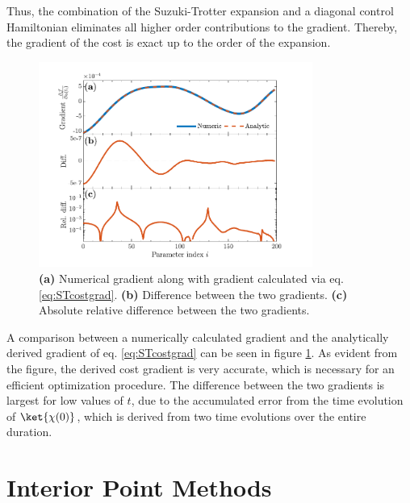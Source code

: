 Thus, the combination of the Suzuki-Trotter expansion and a diagonal control Hamiltonian eliminates all higher order contributions to the gradient. Thereby, the gradient of the cost is exact up to the order of the expansion.
\begin{figure}[!h]
    \centering
    \includegraphics[width=0.8\textwidth]{Figures/CompareGradientsGRAPE.pdf}
    \caption{\textbf{(a)} Numerical gradient along with gradient calculated via eq. \eqref{eq:STcostgrad}. \textbf{(b)} Difference between the two gradients. \textbf{(c)} Absolute relative difference between the two gradients.}
    \label{fig:CompareGradientsGRAPE}
\end{figure}
A comparison between a numerically calculated gradient and the analytically derived gradient of eq. \eqref{eq:STcostgrad} can be seen in figure \ref{fig:CompareGradientsGRAPE}. As evident from the figure, the derived cost gradient is very accurate, which is necessary for an efficient optimization procedure. The difference between the two gradients is largest for low values of $t$, due to the accumulated error from the time evolution of $\ket{\chi (0)}$, which is derived from two time evolutions over the entire duration.


\section{Interior Point Methods} \label{sec:IntPoint}

